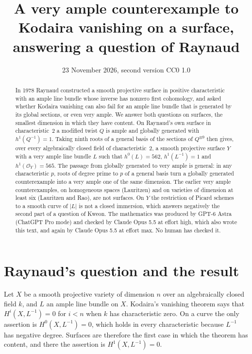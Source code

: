 \documentclass[11pt,a4paper]{article}
\title{A very ample counterexample to Kodaira vanishing on a surface,\\ answering a question of Raynaud}
\author{}
\date{23 November 2026, second version \quad CC0 1.0}
\theoremstyle{plain}
\theoremstyle{remark}
\newcommand{\OO}{\mathcal O}
\begin{document}
\maketitle

\begin{abstract}
\noindent
In 1978 Raynaud constructed a smooth projective surface in positive characteristic with an ample line bundle whose
inverse has nonzero first cohomology, and asked whether Kodaira vanishing can also fail for an ample line bundle that
is generated by its global sections, or even very ample. We answer both questions on surfaces, the smallest dimension
in which they have content. On Raynaud's own surface in characteristic~$2$ a modified twist $Q$ is ample and globally
generated with $h^1(Q^{-1})=1$. Taking ninth roots of a general basis of the sections of $Q^{\otimes 9}$ then gives,
over every algebraically closed field of characteristic~$2$, a smooth projective surface $Y$ with a very ample line
bundle $L$ such that $h^0(L)=562$, $h^1(L^{-1})=1$ and $h^1(\OO_Y)=565$. The passage from globally generated to very
ample is general: in any characteristic $p$, roots of degree prime to $p$ of a general basis turn a globally generated
counterexample into a very ample one of the same dimension. The earlier very ample counterexamples, on homogeneous
spaces (Lauritzen) and on varieties of dimension at least six (Lauritzen and Rao), are not surfaces. On $Y$ the
restriction of Picard schemes to a smooth curve of $|L|$ is not a closed immersion, which answers negatively the
second part of a question of Kweon. The mathematics was produced by GPT-6 Astra (ChatGPT Pro mode) and
checked by Claude Opus 5.5 at effort high, which also wrote this text, and again by Claude Opus 5.5 at effort max. No human
has checked it.
\end{abstract}

\section{Raynaud's question and the result}

Let $X$ be a smooth projective variety of dimension $n$ over an algebraically closed field $k$, and $L$ an ample line
bundle on $X$. Kodaira's vanishing theorem says that $H^i(X,L^{-1})=0$ for $i<n$ when $k$ has characteristic zero. On
a curve the only assertion is $H^0(X,L^{-1})=0$, which holds in every characteristic because $L^{-1}$ has negative
degree. Surfaces are therefore the first case in which the theorem has content, and there the assertion is
$H^1(X,L^{-1})=0$.
\end{document}
